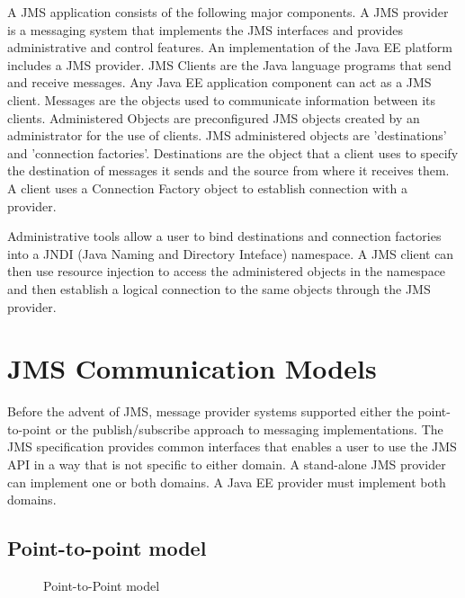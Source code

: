 \documentclass[9pt,twocolumn,twoside]{styles/osajnl}
\begin{document}
A JMS application consists of the following major components.  A JMS
provider is a messaging system that implements the JMS interfaces and
provides administrative and control features. An implementation of the
Java EE platform includes a JMS provider. \cite{www-jms-tutorialoracle} JMS Clients are the Java
language programs that send and receive messages. Any Java EE
application component can act as a JMS client.  Messages are the
objects used to communicate information between its clients.
Administered Objects are preconfigured JMS objects created by an
administrator for the use of clients.  JMS administered objects are
'destinations' and 'connection factories'. Destinations are the object
that a client uses to specify the destination of messages it sends and
the source from where it receives them.  A client uses a Connection
Factory object to establish connection with a provider.

Administrative tools allow a user to bind destinations and connection
factories into a JNDI (Java Naming and Directory Inteface)
namespace. A JMS client can then use resource injection to access the
administered objects in the namespace and then establish a logical
connection to the same objects through the JMS provider. \cite{www-jms-tutorialoracle}


\section{JMS Communication Models}

Before the advent of JMS, message provider systems supported either
the point-to-point or the publish/subscribe approach to messaging
implementations. The JMS specification provides common interfaces that
enables a user to use the JMS API in a way that is not specific to
either domain. A stand-alone JMS provider can implement one or both
domains. A Java EE provider must implement both domains.

\subsection{Point-to-point model}

\begin{figure}[htbp]
\centering
{}
\caption{\cite{www-jms-tutorialoracle} Point-to-Point model}
\label{fig:Point-to-Point messaging}
\end{figure}
\end{document}
